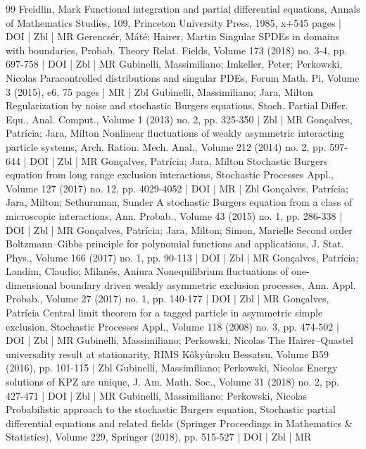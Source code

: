 \documentclass[10pt]{amsart}
\theoremstyle{definition}\newtheorem{defi}[theo]{Definition}\newtheorem{rema}[theo]{Remark}\newtheorem{exam}[theo]{Example}\newtheorem{exem}[theo]{Example}\newtheorem{nota}[theo]{Notation}
\begin{document}
\begin{thebibliography}{99}
Freidlin, Mark Functional integration and partial differential equations, Annals of Mathematics Studies, 109, Princeton University Press, 1985, x+545 pages | DOI | Zbl | MR
Gerencsér, Máté; Hairer, Martin Singular SPDEs in domains with boundaries, Probab. Theory Relat. Fields, Volume 173 (2018) no. 3-4, pp. 697-758 | DOI | Zbl | MR
Gubinelli, Massimiliano; Imkeller, Peter; Perkowski, Nicolas Paracontrolled distributions and singular PDEs, Forum Math. Pi, Volume 3 (2015), e6, 75 pages | MR | Zbl
Gubinelli, Massimiliano; Jara, Milton Regularization by noise and stochastic Burgers equations, Stoch. Partial Differ. Equ., Anal. Comput., Volume 1 (2013) no. 2, pp. 325-350 | Zbl | MR
Gonçalves, Patrícia; Jara, Milton Nonlinear fluctuations of weakly asymmetric interacting particle systems, Arch. Ration. Mech. Anal., Volume 212 (2014) no. 2, pp. 597-644 | DOI | Zbl | MR
Gonçalves, Patrícia; Jara, Milton Stochastic Burgers equation from long range exclusion interactions, Stochastic Processes Appl., Volume 127 (2017) no. 12, pp. 4029-4052 | DOI | MR | Zbl
Gonçalves, Patrícia; Jara, Milton; Sethuraman, Sunder A stochastic Burgers equation from a class of microscopic interactions, Ann. Probab., Volume 43 (2015) no. 1, pp. 286-338 | DOI | Zbl | MR
Gonçalves, Patrícia; Jara, Milton; Simon, Marielle Second order Boltzmann–Gibbs principle for polynomial functions and applications, J. Stat. Phys., Volume 166 (2017) no. 1, pp. 90-113 | DOI | Zbl | MR
Gonçalves, Patrícia; Landim, Claudio; Milanés, Aniura Nonequilibrium fluctuations of one-dimensional boundary driven weakly asymmetric exclusion processes, Ann. Appl. Probab., Volume 27 (2017) no. 1, pp. 140-177 | DOI | Zbl | MR
Gonçalves, Patrícia Central limit theorem for a tagged particle in asymmetric simple exclusion, Stochastic Processes Appl., Volume 118 (2008) no. 3, pp. 474-502 | DOI | Zbl | MR
Gubinelli, Massimiliano; Perkowski, Nicolas The Hairer–Quastel universality result at stationarity, RIMS Kôkyûroku Bessatsu, Volume B59 (2016), pp. 101-115 | Zbl
Gubinelli, Massimiliano; Perkowski, Nicolas Energy solutions of KPZ are unique, J. Am. Math. Soc., Volume 31 (2018) no. 2, pp. 427-471 | DOI | Zbl | MR
Gubinelli, Massimiliano; Perkowski, Nicolas Probabilistic approach to the stochastic Burgers equation, Stochastic partial differential equations and related fields (Springer Proceedings in Mathematics \& Statistics), Volume 229, Springer (2018), pp. 515-527 | DOI | Zbl | MR

\end{thebibliography}
\end{document}
